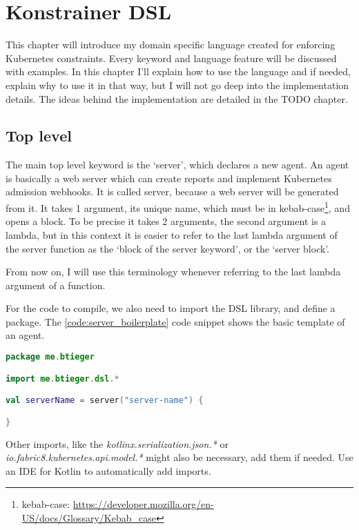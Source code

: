 \chapter{Konstrainer DSL}
\label{chap:konst_dsl}

This chapter will introduce my domain specific language created for enforcing Kubernetes constraints. Every keyword and language feature will be discussed with examples. In this chapter I'll explain how to use the language and if needed, explain why to use it in that way, but I will not go deep into the implementation details. The ideas behind the implementation are detailed in the TODO chapter.

\section{Top level}

The main top level keyword is the `server', which declares a new agent. An agent is basically a web server which can create reports and implement Kubernetes admission webhooks. It is called server, because a web server will be generated from it. It takes 1 argument, its unique name, which must be in kebab-case\footnote{kebab-case: \url{https://developer.mozilla.org/en-US/docs/Glossary/Kebab_case}}, and opens a block. To be precise it takes 2 arguments, the second argument is a lambda, but in this context it is easier to refer to the last lambda argument of the server function as the `block of the server keyword', or the `server block'.

From now on, I will use this terminology whenever referring to the last lambda argument of a function.

For the code to compile, we also need to import the DSL library, and define a package. The \ref{code:server_boilerplate} code snippet shows the basic template of an agent.

\begin{lstlisting}[caption={Template of a DSL file},language=Kotlin,label=code:server_boilerplate]
package me.btieger

import me.btieger.dsl.*

val serverName = server("server-name") {

}
\end{lstlisting}

Other imports, like the \emph{kotlinx.serialization.json.*} or \emph{io.fabric8.kubernetes.api.model.*} might also be necessary, add them if needed. Use an IDE for Kotlin to automatically add imports.

